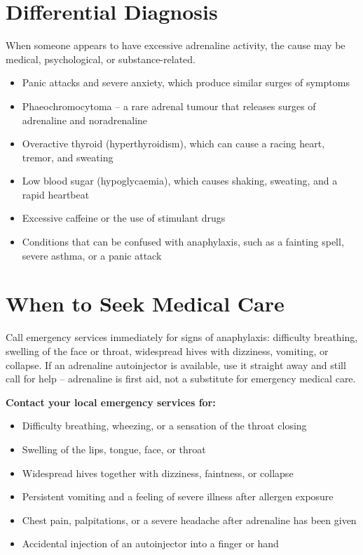 \section*{Differential Diagnosis}
When someone appears to have excessive adrenaline activity, the cause may be medical, psychological, or substance-related.

\begin{itemize}
    \item Panic attacks and severe anxiety, which produce similar surges of symptoms
    \item Phaeochromocytoma -- a rare adrenal tumour that releases surges of adrenaline and noradrenaline
    \item Overactive thyroid (hyperthyroidism), which can cause a racing heart, tremor, and sweating
    \item Low blood sugar (hypoglycaemia), which causes shaking, sweating, and a rapid heartbeat
    \item Excessive caffeine or the use of stimulant drugs
    \item Conditions that can be confused with anaphylaxis, such as a fainting spell, severe asthma, or a panic attack
\end{itemize}

\section*{When to Seek Medical Care}
Call emergency services immediately for signs of anaphylaxis: difficulty breathing, swelling of the face or throat, widespread hives with dizziness, vomiting, or collapse. If an adrenaline autoinjector is available, use it straight away and still call for help -- adrenaline is first aid, not a substitute for emergency medical care.

\textbf{Contact your local emergency services for:}
\begin{itemize}
    \item Difficulty breathing, wheezing, or a sensation of the throat closing
    \item Swelling of the lips, tongue, face, or throat
    \item Widespread hives together with dizziness, faintness, or collapse
    \item Persistent vomiting and a feeling of severe illness after allergen exposure
    \item Chest pain, palpitations, or a severe headache after adrenaline has been given
    \item Accidental injection of an autoinjector into a finger or hand
\end{itemize}

